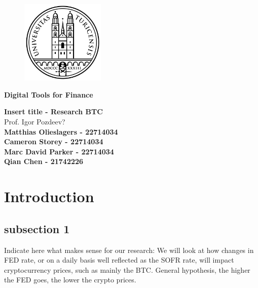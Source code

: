 \documentclass[12pt]{article}
\begin{document}
\pagestyle{empty}

\bigskip

\begin{figure}[htp]
    \centering
    \includegraphics[width=4cm]{uzh logo 2.png}
    \label{fig:UZH}
\end{figure}

\begin{Large}
	\begin{center}
		\textbf{Digital Tools for Finance}
	\end{center}
\end{Large}

\vspace{2cm}

\begin{large}	
	\begin{center}
		\textbf{Insert title - Research BTC} \vspace{0.1cm} \\ {Prof. Igor Pozdeev? } \vspace{2cm} \\ \textbf{Matthias Olieslagers - 22714034}  \\ \textbf{Cameron Storey - 22714034} \\ 
        \textbf{Marc David Parker - 22714034}\\
        \textbf{Qian Chen - 21742226}\\
	\end{center}
\end{large}

\tableofcontents

\newpage

\bigskip
\section{Introduction}

\subsection*{subsection 1}

Indicate here what makes sense for our research:
\newline \newline
We will look at how changes in FED rate, or on a daily basis well reflected as the SOFR rate, will impact cryptocurrency prices, such as mainly the BTC. 
General hypothesis, the higher the FED goes, the lower the crypto prices. 
\end{document}
